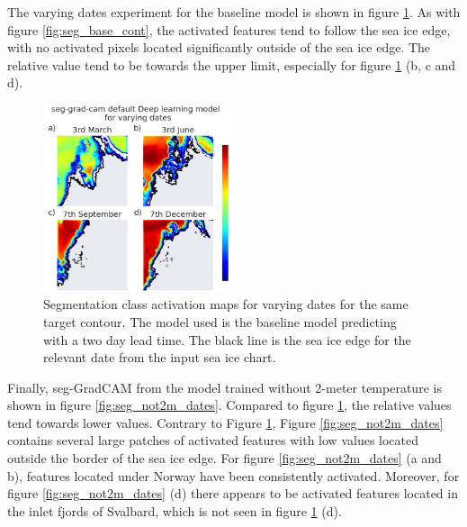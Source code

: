 \documentclass[../main/thesis.tex]{subfiles}
\begin{document}
The varying dates experiment for the baseline model is shown in figure \ref{fig:seg_base_dates}. As with figure \ref{fig:seg_base_cont}, the activated features tend to follow the sea ice edge, with no activated pixels located significantly outside of the sea ice edge. The relative value tend to be towards the upper limit, especially for figure \ref{fig:seg_base_dates} (b, c and d).

\begin{figure}
    \centering
    \includegraphics[width=0.49\textwidth]{baseline_dates}
    \caption{\label{fig:seg_base_dates}Segmentation class activation maps for varying dates for the same target contour. The model used is the baseline model predicting with a two day lead time. The black line is the sea ice edge for the relevant date from the input sea ice chart.}
\end{figure}

Finally, seg-GradCAM from the model trained without 2-meter temperature is shown in figure \ref{fig:seg_not2m_dates}. Compared to figure \ref{fig:seg_base_dates}, the relative values tend towards lower values. Contrary to Figure \ref{fig:seg_base_dates}, Figure \ref{fig:seg_not2m_dates} contains several large patches of activated features with low values located outside the border of the sea ice edge. For figure \ref{fig:seg_not2m_dates} (a and b), features located under Norway have been consistently activated. Moreover, for figure \ref{fig:seg_not2m_dates} (d) there appears to be activated features located in the inlet fjords of Svalbard, which is not seen in figure \ref{fig:seg_base_dates} (d).
\end{document}

